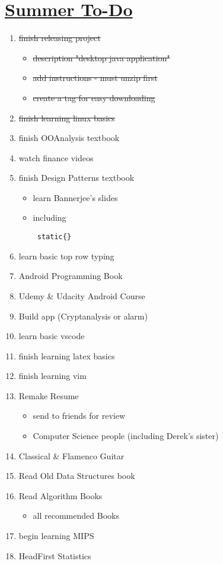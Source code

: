 \documentclass[10pt]{article}
\begin{document}
\section*{\underline{Summer To-Do}}

\begin{enumerate}
    \item \sout{finish releasing project}
    \begin{itemize}
	    \item \sout{description "desktop java application"}
	    \item \sout{add instructions - must unzip first}
        \item \sout{create a tag for easy downloading}
    \end{itemize}
    \item \sout{finish learning linux basics}
    \item finish OOAnalysis textbook
    \item watch finance videos
    \item finish Design Patterns textbook
    \begin{itemize}
            \item learn Bannerjee's slides
            \item including \begin{verbatim} static{} \end{verbatim}
    \end{itemize}
    \item learn basic top row typing
    \item Android Programming Book
    \item Udemy \& Udacity Android Course
    \item Build app (Cryptanalysis or alarm)
    \item learn basic vscode
    \item finish learning latex basics
    \item finish learning vim
    \item Remake Resume
    \begin{itemize}
        \item send to friends for review
        \item Computer Science people (including Derek's sister)
    \end{itemize}
    \item Classical \& Flamenco Guitar
    \item Read Old Data Structures book
    \item Read Algorithm Books
    \begin{itemize}
        \item all recommended Books
    \end{itemize}
    \item begin learning MIPS
    \item HeadFirst Statistics

\end{enumerate}
\end{document}
